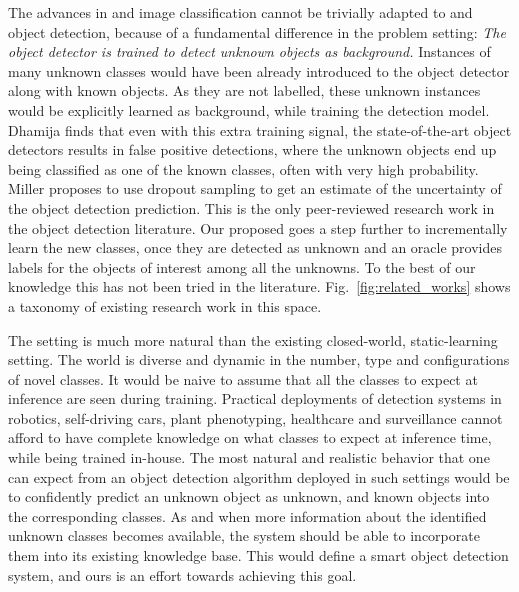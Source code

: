 \documentclass[final]{cvpr}
\begin{document}
The advances in \OS and \OW image classification cannot be trivially adapted to \OS and \OW object detection, because of a fundamental difference in the problem setting: 
\textit{The object detector is trained to detect unknown objects as background.} Instances of many unknown classes would have been already introduced to the object detector along with known objects. As they are not labelled, these unknown instances would be explicitly learned as background, while training the detection model.
Dhamija \etal \cite{dhamija2020overlooked} finds that even with this extra training signal, the state-of-the-art object detectors results in false positive detections, where the unknown objects end up being classified as one of the known classes, often with very high probability. Miller \etal \cite{miller2018dropout} proposes to use dropout sampling to get an estimate of the uncertainty of the object detection prediction. This is the only peer-reviewed research work in the \os object detection literature.
Our proposed \OWOD goes a step further to incrementally learn the new classes, once they are detected as unknown and an oracle provides labels for the objects of interest among all the unknowns. To the best of our knowledge this has not been tried in the literature. 
Fig.~\ref{fig:related_works} shows a taxonomy of existing research work in this space.


The \OWOD setting is much more natural than the existing closed-world, static-learning setting. The world is diverse and dynamic in the number, type and configurations of novel classes. It would be naive to assume that all the classes to expect at inference are seen during training. Practical deployments of detection systems in robotics, self-driving cars, plant phenotyping, healthcare and surveillance cannot afford to have complete knowledge on what classes to expect at inference time, while being trained in-house. The most natural and realistic behavior that one can expect from an object detection algorithm deployed in such settings would be to confidently predict an unknown object as unknown, and known objects into the corresponding classes. As and when more information about the identified unknown classes becomes available, the system should be able to incorporate them into its existing knowledge base. This would define a smart object detection system, and ours is an effort towards achieving this goal.
\end{document}
